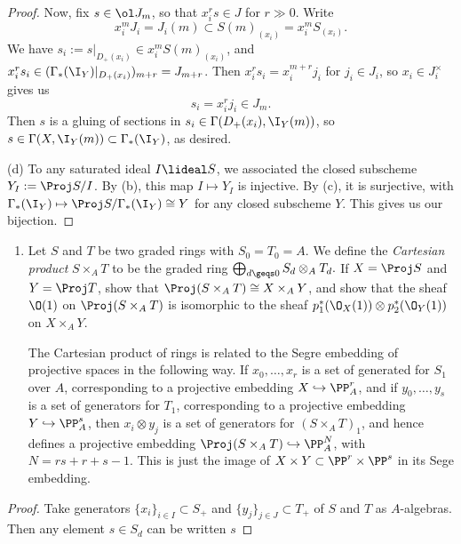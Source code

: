 \documentclass[12pt]{amsart}
\begin{document}
\begin{proof}
  Now, fix $s\in \ol J_m$, so that $x_i^rs\in J$ for $r\gg0$.
  Write
  \[
    x_i^mJ_i=J_i(m)\subset S(m)_{(x_i)}=x_i^m S_{(x_i)}.
  \]
  We have $s_i:=s|_{D_+(x_i)}\in x_i^mS(m)_{(x_i)}$, and $x_i^rs_i \in (\Gamma_*(\I_Y)|_{D_+(x_i)})_{m+r}=J_{m+r}$.
  Then $x_i^rs_i=x_i^{m+r}j_i$ for $j_i\in J_i$, so $x_i\in J_i^\times$ gives us
  \[
    s_i=x_i^rj_i\in J_m.
  \]
  Then $s$ is a gluing of sections in $s_i\in\Gamma(D_+(x_i),\I_Y(m))$, so $s\in \Gamma(X,\I_Y(m))\subset \Gamma_*(\I_Y)$, as desired.

  (d) To any saturated ideal $I\lideal S$, we associated the closed subscheme $Y_I:=\Proj S/I$.
  By (b), this map $I\mapsto Y_I$ is injective.
  By (c), it is surjective, with $\Gamma_*(\I_Y)\mapsto \Proj S/\Gamma_*(\I_Y)\cong Y$ for any closed subscheme $Y$.
  This gives us our bijection.

\end{proof}

\begin{enumerate}
  \item[5.11.] {
      Let $S$ and $T$ be two graded rings with $S_0=T_0=A$.
      We define the \emph{Cartesian product} $S\times_A T$ to be the graded ring $\bigoplus_{d\geqs 0}S_d\otimes_A T_d.$
      If $X=\Proj S$ and $Y=\Proj T$, show that $\Proj (S\times_A T) \cong X\times_A Y$, and show that the sheaf $\O(1)$ on $\Proj(S\times_A T)$ is isomorphic to the sheaf $p_1^*(\O_X(1))\otimes p_2^*(\O_Y(1))$ on $X\times_A Y$.

      The Cartesian product of rings is related to the Segre embedding of projective spaces in the following way.
      If $x_0,\ldots, x_r$ is a set of generated for $S_1$ over $A$, corresponding to a projective embedding $X\hookrightarrow \PP_A^r$, and if $y_0,\ldots, y_s$ is a set of generators for $T_1$, corresponding to a projective embedding $Y\hookrightarrow \PP_A^s$, then $x_i\otimes y_j$ is a set of generators for $(S\times_A T)_1$, and hence defines a projective embedding $\Proj (S\times_A T)\hookrightarrow \PP_A^N$, with $N=rs + r + s-1$.
      This is just the image of $X\times Y\subset \PP^r\times \PP^s$ in its Sege embedding.
    }
\end{enumerate}

\begin{proof}
  Take generators $\{x_i\}_{i\in I}\subset S_+$ and $\{y_j\}_{j\in J}\subset T_+$ of $S$ and $T$ as $A$-algebras.
  Then any element $s\in S_d$ can be written $s$
\end{proof}
\end{document}
